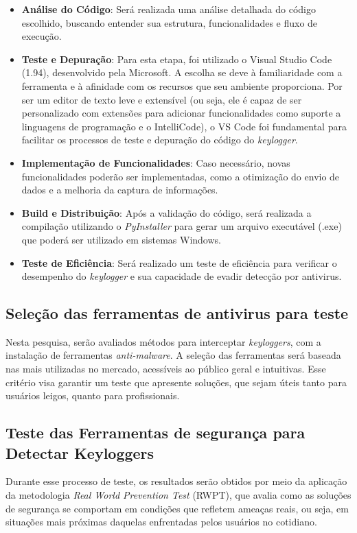 \documentclass[12pt]{article}
\begin{document}
\begin{itemize}
    \item \textbf{Análise do Código}: Será realizada uma análise detalhada do código escolhido, buscando entender sua estrutura, funcionalidades e fluxo de execução.
    \item \textbf{Teste e Depuração}: Para esta etapa, 
    foi utilizado o Visual Studio Code (1.94), desenvolvido pela Microsoft. 
    A escolha se deve à familiaridade com a ferramenta e à afinidade com os recursos que seu ambiente 
    proporciona. Por ser um editor de texto leve e extensível 
    (ou seja, ele é capaz de ser personalizado com extensões para adicionar  
    funcionalidades como suporte a linguagens de programação e o IntelliCode), 
    o VS Code foi fundamental para facilitar os processos de teste e depuração do código do \textit{keylogger}.
    \item \textbf{Implementação de Funcionalidades}: Caso necessário, novas funcionalidades poderão ser implementadas, como a otimização do envio de dados e a melhoria da captura de informações.
    \item \textbf{Build e Distribuição}: Após a validação do código, será realizada a compilação utilizando o \textit{PyInstaller} para gerar um arquivo executável (.exe) que poderá ser utilizado em sistemas Windows.
    \item \textbf{Teste de Eficiência}: Será realizado um teste de eficiência para verificar o desempenho do \textit{keylogger} e sua capacidade de evadir detecção por antivirus.
\end{itemize}

\subsection{Seleção das ferramentas de antivirus para teste}
Nesta pesquisa, serão avaliados métodos para interceptar \textit{keyloggers}, 
com a instalação de ferramentas \textit{anti-malware}. 
A seleção das ferramentas será baseada nas mais utilizadas no mercado, 
acessíveis ao público geral e intuitivas. Esse critério visa garantir um teste que apresente
soluções, que sejam úteis tanto para usuários leigos, quanto para profissionais.

\subsection{Teste das Ferramentas de segurança para Detectar Keyloggers}
Durante esse processo de teste, os resultados serão obtidos por meio da aplicação 
da metodologia \textit{Real World Prevention Test} (RWPT), que avalia como as soluções 
de segurança se comportam em condições que refletem ameaças reais, ou seja, em 
situações mais próximas daquelas enfrentadas pelos usuários no cotidiano. 
\end{document}
